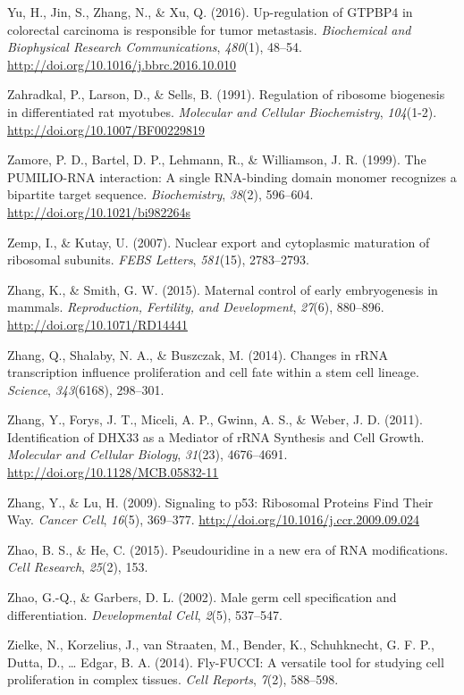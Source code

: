 \documentclass[12pt,twoside]{reedthesis}
\newlength{\cslhangindent}
\newenvironment{cslreferences}%
  {\setlength{\parindent}{0pt}%
  \everypar{\setlength{\hangindent}{\cslhangindent}}\ignorespaces}%
  {\par}
\begin{document}
\begin{cslreferences}
\leavevmode\hypertarget{ref-yuUpregulationGTPBP4Colorectal2016}{}%
Yu, H., Jin, S., Zhang, N., \& Xu, Q. (2016). Up-regulation of GTPBP4 in colorectal carcinoma is responsible for tumor metastasis. \emph{Biochemical and Biophysical Research Communications}, \emph{480}(1), 48--54. \url{http://doi.org/10.1016/j.bbrc.2016.10.010}

\leavevmode\hypertarget{ref-zahradkalRegulationRibosomeBiogenesis1991}{}%
Zahradkal, P., Larson, D., \& Sells, B. (1991). Regulation of ribosome biogenesis in differentiated rat myotubes. \emph{Molecular and Cellular Biochemistry}, \emph{104}(1-2). \url{http://doi.org/10.1007/BF00229819}

\leavevmode\hypertarget{ref-Zamore1999b}{}%
Zamore, P. D., Bartel, D. P., Lehmann, R., \& Williamson, J. R. (1999). The PUMILIO-RNA interaction: A single RNA-binding domain monomer recognizes a bipartite target sequence. \emph{Biochemistry}, \emph{38}(2), 596--604. \url{http://doi.org/10.1021/bi982264s}

\leavevmode\hypertarget{ref-Zemp2007}{}%
Zemp, I., \& Kutay, U. (2007). Nuclear export and cytoplasmic maturation of ribosomal subunits. \emph{FEBS Letters}, \emph{581}(15), 2783--2793.

\leavevmode\hypertarget{ref-Zhang2015c}{}%
Zhang, K., \& Smith, G. W. (2015). Maternal control of early embryogenesis in mammals. \emph{Reproduction, Fertility, and Development}, \emph{27}(6), 880--896. \url{http://doi.org/10.1071/RD14441}

\leavevmode\hypertarget{ref-Zhang2014d}{}%
Zhang, Q., Shalaby, N. A., \& Buszczak, M. (2014). Changes in rRNA transcription influence proliferation and cell fate within a stem cell lineage. \emph{Science}, \emph{343}(6168), 298--301.

\leavevmode\hypertarget{ref-zhangIdentificationDHX33Mediator2011}{}%
Zhang, Y., Forys, J. T., Miceli, A. P., Gwinn, A. S., \& Weber, J. D. (2011). Identification of DHX33 as a Mediator of rRNA Synthesis and Cell Growth. \emph{Molecular and Cellular Biology}, \emph{31}(23), 4676--4691. \url{http://doi.org/10.1128/MCB.05832-11}

\leavevmode\hypertarget{ref-zhangSignalingP53Ribosomal2009}{}%
Zhang, Y., \& Lu, H. (2009). Signaling to p53: Ribosomal Proteins Find Their Way. \emph{Cancer Cell}, \emph{16}(5), 369--377. \url{http://doi.org/10.1016/j.ccr.2009.09.024}

\leavevmode\hypertarget{ref-Zhao2015}{}%
Zhao, B. S., \& He, C. (2015). Pseudouridine in a new era of RNA modifications. \emph{Cell Research}, \emph{25}(2), 153.

\leavevmode\hypertarget{ref-Zhao2002d}{}%
Zhao, G.-Q., \& Garbers, D. L. (2002). Male germ cell specification and differentiation. \emph{Developmental Cell}, \emph{2}(5), 537--547.

\leavevmode\hypertarget{ref-Zielke2014a}{}%
Zielke, N., Korzelius, J., van Straaten, M., Bender, K., Schuhknecht, G. F. P., Dutta, D., \ldots{} Edgar, B. A. (2014). Fly-FUCCI: A versatile tool for studying cell proliferation in complex tissues. \emph{Cell Reports}, \emph{7}(2), 588--598.
\end{cslreferences}

\end{document}
